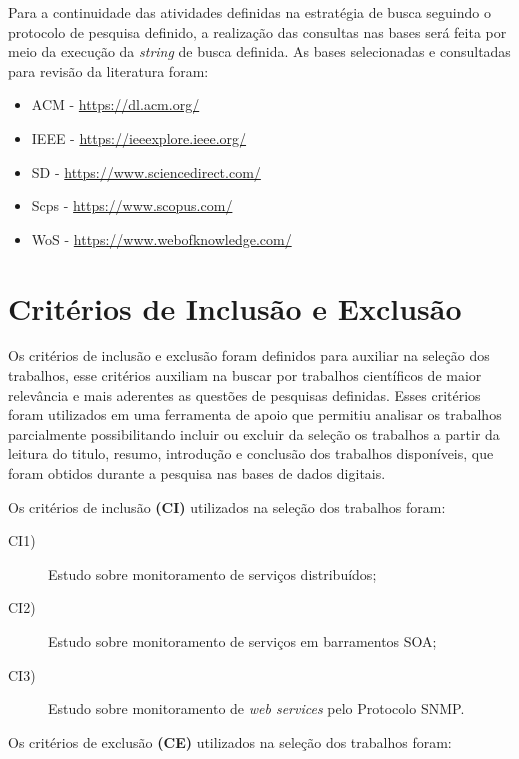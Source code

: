 Para a continuidade das atividades definidas na estratégia de busca seguindo o protocolo de pesquisa definido, a realização das consultas nas bases será feita por meio da execução da \textit{string} de busca definida. As bases selecionadas e consultadas para revisão da literatura foram:
\begin{itemize}
\item \acrlong{ACM} - \url{https://dl.acm.org/}
\item \acrlong{IEEE} - \url{https://ieeexplore.ieee.org/}
\item \acrlong{SD} - \url{https://www.sciencedirect.com/}
\item \acrlong{Scps} - \url{https://www.scopus.com/}
\item \acrlong{WoS} - \url{https://www.webofknowledge.com/}
\end{itemize}


\section{Critérios de Inclusão e Exclusão}
\label{sec:cIncExc}
Os critérios de inclusão e exclusão foram definidos para auxiliar na seleção dos trabalhos, esse critérios auxiliam na buscar por trabalhos científicos de maior relevância e mais aderentes as questões de pesquisas definidas. Esses critérios foram utilizados em uma ferramenta de apoio que permitiu analisar os trabalhos parcialmente possibilitando incluir ou excluir da seleção os trabalhos a partir da leitura do titulo, resumo, introdução e conclusão dos trabalhos disponíveis, que foram obtidos durante a pesquisa nas bases de dados digitais.    

Os critérios de inclusão \textbf{(CI)} utilizados na seleção dos trabalhos foram:

\begin{description}

\item[CI1)] Estudo sobre monitoramento de serviços distribuídos;
\item[CI2)] Estudo sobre monitoramento de serviços em barramentos \acrshort{SOA};
\item[CI3)] Estudo sobre monitoramento de \textit{web services} pelo Protocolo \acrshort{SNMP}.
\end{description}

Os critérios de exclusão \textbf{(CE)} utilizados na seleção dos trabalhos foram:

